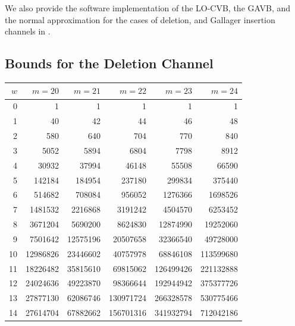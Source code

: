 \documentclass[journal, twocol]{IEEEtran}
\begin{document}
We also provide the software implementation of the LO-CVB, the GAVB, and the normal approximation for the cases of deletion, and Gallager insertion channels in \cite{morozov25software}.

\subsection{Bounds for the Deletion Channel}
\label{s:nrd}

\begin{table}
\centering
\small
\begin{tabular}{|@{\hskip.08cm}r@{\hskip.08cm}||@{\hskip.08cm}r@{\hskip.08cm}|@{\hskip.08cm}r@{\hskip.08cm}|@{\hskip.08cm}r@{\hskip.08cm}|@{\hskip.08cm}r@{\hskip.08cm}|@{\hskip.08cm}r@{\hskip.08cm}|}
\hline
$w$& $m=20$   & $m=21$   & $m=22$    & $m=23$    & $m=24$ \\\hline\hline
0  & 1        & 1        & 1         & 1         & 1\\\hline
1  & 40       & 42       & 44        & 46        & 48\\\hline
2  & 580      & 640      & 704       & 770       & 840\\\hline
3  & 5052     & 5894     & 6804      & 7798      & 8912\\\hline
4  & 30932    & 37994    & 46148     & 55508     & 66590\\\hline
5  & 142184   & 184954   & 237180    & 299834    & 375440\\\hline
6  & 514682   & 708084   & 956052    & 1276366   & 1698526\\\hline
7  & 1481532  & 2216868  & 3191242   & 4504570   & 6253452\\\hline
8  & 3671204  & 5690200  & 8624830   & 12874990  & 19252060\\\hline
9  & 7501642  & 12575196 & 20507658  & 32366540  & 49728000\\\hline
10 & 12986826 & 23446602 & 40757978  & 68846108  & 113599680\\\hline
11 & 18226482 & 35815610 & 69815062  & 126499426 & 221132888\\\hline
12 & 24024636 & 49223870 & 98366644  & 192944942 & 375377726\\\hline
13 & 27877130 & 62086746 & 130971724 & 266328578 & 530775466\\\hline
14 & 27614704 & 67882662 & 156701316 & 341932794 & 712042186\\\hline

\end{tabular}
\end{table}
\end{document}
